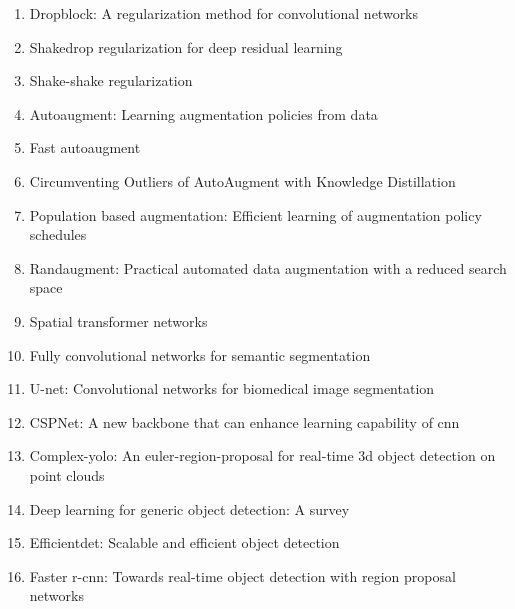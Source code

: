 \documentclass[acmlarge]{acmart}
\begin{document}
\begin{enumerate}
	\item Dropblock: A regularization method for convolutional networks \cite{ghiasi2018dropblock} 

	\item Shakedrop regularization for deep residual learning \cite{yamada2019shakedrop} 

	\item Shake-shake regularization \cite{gastaldi2017shake} 

	\item Autoaugment: Learning augmentation policies from data \cite{cubuk2018autoaugment} 

	\item Fast autoaugment \cite{lim2019fast} 

	\item Circumventing Outliers of AutoAugment with Knowledge Distillation \cite{wei2020circumventing} 

	\item Population based augmentation: Efficient learning of augmentation policy schedules \cite{ho2019population} 

	\item Randaugment: Practical automated data augmentation with a reduced search space \cite{cubuk2020randaugment} 

	\item Spatial transformer networks \cite{jaderberg2015spatial} 

	\item Fully convolutional networks for semantic segmentation \cite{long2015fully} 

	\item U-net: Convolutional networks for biomedical image segmentation \cite{ronneberger2015u} 

	\item CSPNet: A new backbone that can enhance learning capability of cnn \cite{wang2020cspnet} 

	\item Complex-yolo: An euler-region-proposal for real-time 3d object detection on point clouds \cite{simony2018complex} 

	\item Deep learning for generic object detection: A survey \cite{liu2020deep} 

	\item Efficientdet: Scalable and efficient object detection \cite{tan2020efficientdet} 

	\item Faster r-cnn: Towards real-time object detection with region proposal networks \cite{ren2015faster} 


\end{enumerate}
\end{document}
